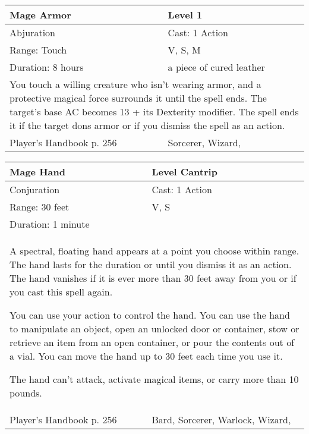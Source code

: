 \documentclass[11pt]{report}
\begin{document}
\begin{table}[H]
	\begin{tabular}{||p{6cm}|p{6cm}||}
		\hline\hline
		\bf{Mage Armor} & Level 1\\ \hline
		Abjuration & Cast: 1 Action\\ \hline
		Range: Touch & V, S, M\\ \hline
		Duration: 8 hours & a piece of cured leather\\ \hline
		\multicolumn{2}{||p{12cm}||}{You touch a willing creature who isn’t wearing armor, and a protective magical force surrounds it until the spell ends. The target’s base AC becomes 13 + its Dexterity modifier. The spell ends it if the target dons armor or if you dismiss the spell as an action.}\\ \hline
Player's Handbook p. 256 & Sorcerer, Wizard, \\ \hline\hline
	\end{tabular}
\end{table}

\begin{table}[H]
	\begin{tabular}{||p{6cm}|p{6cm}||}
		\hline\hline
		\bf{Mage Hand} & Level Cantrip\\ \hline
		Conjuration & Cast: 1 Action\\ \hline
		Range: 30 feet & V, S\\ \hline
		Duration: 1 minute & \\ \hline
		\multicolumn{2}{||p{12cm}||}{A spectral, floating hand appears at a point you choose within range.
The hand lasts for the duration or until you dismiss it as an action. The hand vanishes if it is ever more than 30 feet away from you or if you cast this spell again.

You can use your action to control the hand. You can use the hand to manipulate an object, open an unlocked door or container, stow or retrieve an item from an open container, or pour the contents out of a vial. You can move the hand up to 30 feet each time you use it.

The hand can’t attack, activate magical items, or carry more than 10 pounds.}\\ \hline
Player's Handbook p. 256 & Bard, Sorcerer, Warlock, Wizard, \\ \hline\hline
	\end{tabular}
\end{table}
\end{document}
